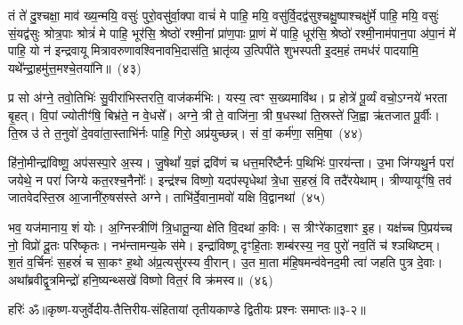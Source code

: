 तं ते॑ दु॒श्चक्षा॒ माव॑ ख्य॒न्मयि॒ वसुः॑ पुरो॒वसु॑र्वा॒क्पा वाचं॑ मे पाहि॒ मयि॒ वसु॑र्वि॒दद्व॑सुश्चक्षु॒ष्पाश्चक्षु॑र्मे पाहि॒ मयि॒ वसुः॑ सं॒यद्व॑सुः श्रोत्र॒पाः श्रोत्रं॑ मे पाहि॒ भूर॑सि॒ श्रेष्ठो॑ रश्मी॒नां प्रा॑ण॒पाः प्रा॒णं मे॑ पाहि॒ धूर॑सि॒ श्रेष्ठो॑ रश्मी॒नाम॑पान॒पा अ॑पा॒नं मे॑ पाहि॒ यो न॑ इन्द्रवायू मित्रावरुणावश्विनावभि॒दास॑ति॒ भ्रातृ॑व्य उ॒त्पिपी॑ते शुभस्पती इ॒दम॒हं तमध॑रं पादयामि॒ यथे᳚न्द्रा॒हमु॑त्त॒मश्चे॒तया॑नि॥~(४३)\ip

{\anuvakamend[{र॒क्ष॒स्व॒ भ्रातृ॑व्य॒स्त्रयो॑दश च}]}%

प्र सो अ॑ग्ने॒ तवो॒तिभिः॑ सु॒वीरा॑भिस्तरति॒ वाज॑कर्मभिः। यस्य॒ त्वꣳ स॒ख्यमावि॑थ। प्र होत्रे॑ पू॒र्व्यं वचो॒\-ऽग्नये॑ भरता बृ॒हत्। वि॒पां ज्योतीꣳ॑षि॒ बिभ्र॑ते॒ न वे॒धसे᳚। अग्ने॒ त्री ते॒ वाजि॑ना॒ त्री ष॒धस्था॑ ति॒स्रस्ते॑ जि॒ह्वा ऋ॑तजात पू॒र्वीः। ति॒स्र उ॑ ते त॒नुवो॑ दे॒ववा॑ता॒स्ताभि॑र्नः पाहि॒ गिरो॒ अप्र॑युच्छन्न्। सं वां॒ कर्म॑णा॒ समि॒षा~(४४)\ip

हि॑नो॒मीन्द्रा॑विष्णू॒ अप॑सस्पा॒रे अ॒स्य। जु॒षेथां᳚ य॒ज्ञं द्रवि॑णं च धत्त॒मरि॑ष्टैर्नः प॒थिभिः॑ पा॒रय॑न्ता। उ॒भा जि॑ग्यथु॒र्न परा॑ जयेथे॒ न परा॑ जिग्ये कत॒रश्च॒नैनोः᳚। इन्द्र॑श्च विष्णो॒ यदप॑स्पृधेथां त्रे॒धा स॒हस्रं॒ वि तदै॑रयेथाम्। त्रीण्यायूꣳ॑षि॒ तव॑ जातवेदस्ति॒स्र आ॒जानी॑रु॒षस॑स्ते अग्ने। ताभि॑र्दे॒वाना॒मवो॑ यक्षि वि॒द्वानथा॑~(४५)\ip

भव॒ यज॑मानाय॒ शं योः। अ॒ग्निस्त्रीणि॑ त्रि॒धातू॒न्या क्षे॑ति वि॒दथा॑ क॒विः। स त्रीꣳरे॑काद॒शाꣳ इ॒ह। यक्ष॑च्च पि॒प्रय॑च्च नो॒ विप्रो॑ दू॒तः परि॑ष्कृतः। नभ॑न्तामन्य॒के स॑मे। इन्द्रा॑विष्णू दृꣳहि॒ताः शम्ब॑रस्य॒ नव॒ पुरो॑ नव॒तिं च॑ श्ञथिष्टम्। श॒तं व॒र्चिनः॑ स॒हस्रं॑ च सा॒कꣳ ह॒थो अ॑प्र॒त्यसु॑रस्य वी॒रान्। उ॒त मा॒ता म॑हि॒षमन्व॑वेनद॒मी त्वा॑ जहति पुत्र दे॒वाः। अथा᳚ब्रवीद्वृ॒त्रमिन्द्रो॑ हनि॒ष्यन्थ्सखे॑ विष्णो वित॒रं वि क्र॑मस्व॥~(४६)\ip

{\anuvakamend[{इ॒षा\-ऽथ॑ त्वा॒ त्रयो॑दश च}]}%

{हरिः॑ ॐ}{॥कृष्ण-यजुर्वेदीय-तैत्तिरीय-संहितायां तृतीयकाण्डे द्वितीयः प्रश्नः समाप्तः॥३-२॥}


